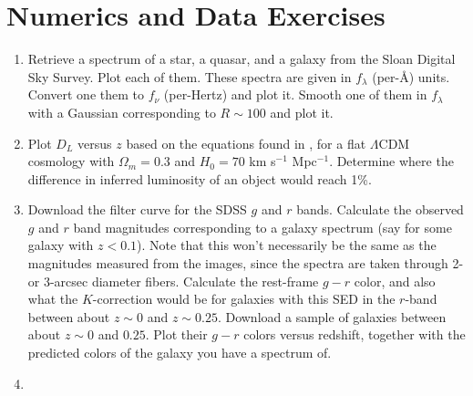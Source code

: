 \section{Numerics and Data Exercises}

\begin{enumerate}
\item Retrieve a spectrum of a star, a quasar, and a galaxy from the
  Sloan Digital Sky Survey. Plot each of them. These spectra are given
  in $f_\lambda$ (per-\AA) units. Convert one them to $f_\nu$
  (per-Hertz) and plot it. Smooth one of them in $f_\lambda$ with a
  Gaussian corresponding to $R\sim 100$ and plot it.
\item Plot $D_L$ versus $z$ based on the equations found
  in \citet{hogg99cosm}, for a flat $\Lambda$CDM cosmology with
  $\Omega_m = 0.3$ and $H_0 = 70$ km s$^{-1}$ Mpc$^{-1}$. Determine
  where the difference in inferred luminosity of an object would reach
  1\%. 
\item Download the filter curve for the SDSS $g$ and $r$
  bands. Calculate the observed $g$ and $r$ band magnitudes
  corresponding to a galaxy spectrum (say for some galaxy with
  $z<0.1$). Note that this won't necessarily be the same as the
  magnitudes measured from the images, since the spectra are taken
  through 2- or 3-arcsec diameter fibers. Calculate the rest-frame
  $g-r$ color, and also what the $K$-correction would be for galaxies
  with this SED in the $r$-band between about $z\sim 0$ and $z\sim
  0.25$. Download a sample of galaxies between about $z\sim 0$ and
  $0.25$. Plot their $g-r$ colors versus redshift, together with the
  predicted colors of the galaxy you have a spectrum of.
\item {}
\end{enumerate}


  
